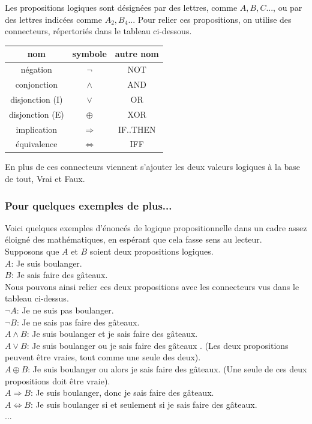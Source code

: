 \documentclass[a4paper, 12pt]{article}
\newcommand{\ffi}{\Leftrightarrow}
\newcommand{\imply}{\Rightarrow}
\numberwithin{equation}{subsection}
\begin{document}
  Les propositions logiques sont désignées par des lettres, comme $ A, B, C$..., ou par des lettres indicées comme $ A_2, B_{4}$...
     Pour relier ces propositions, on utilise des connecteurs, répertoriés dans le tableau ci-dessous. \\
     \begin{table}[H]
       \centering
       \begin{tabular}{|c|c|c|}
         \hline {\bf nom }       & {\bf symbole}     & {\bf autre nom}  \\
         \hline négation         & $\neg$            & NOT              \\
         conjonction             & $\land$           & AND              \\
         disjonction (I)         & $\lor$            & OR               \\
         disjonction (E)         & $\oplus$          & XOR              \\
         implication             & $\imply$          & IF..THEN         \\
         équivalence             & $\ffi$            & IFF              \\
         \hline
       \end{tabular}
    \end{table}
  En plus de ces connecteurs viennent s'ajouter les deux valeurs logiques à la base de tout, Vrai et Faux.
    \subsubsection{Pour quelques exemples de plus...}
    Voici quelques exemples d'énoncés de logique propositionnelle dans un cadre assez éloigné des mathématiques, en espérant que cela fasse sens au lecteur.\\

        Supposons que $A$ et $B$ soient deux propositions logiques. \\
        $A$: Je suis boulanger. \\
        $B$: Je sais faire des gâteaux. \\
        Nous pouvons ainsi relier ces deux propositions avec les connecteurs vus dans le tableau ci-dessus. \\
        $\neg A$: Je ne suis pas boulanger. \\
        $\neg B$: Je ne sais pas faire des gâteaux. \\
        $A \land B$: Je suis boulanger et je sais faire des gâteaux. \\
        $A \lor B$: Je suis boulanger ou je sais faire des gâteaux . (Les deux propositions peuvent être vraies, tout comme une seule des deux). \\
        $A \oplus B$: Je suis boulanger ou alors je sais faire des gâteaux. (Une seule de ces deux propositions doit être vraie). \\
        $A \imply B$: Je suis boulanger, donc je sais faire des gâteaux. \\
        $A \ffi B$: Je suis boulanger si et seulement si je sais faire des gâteaux. \\
        ...
\end{document}
